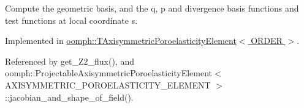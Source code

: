 Compute the geometric basis, and the q, p and divergence basis functions and test functions at local coordinate s. 



Implemented in \hyperlink{classoomph_1_1TAxisymmetricPoroelasticityElement_aac2d7977167e87f6e7c3e3f3fef4a60c}{oomph\+::\+T\+Axisymmetric\+Poroelasticity\+Element$<$ O\+R\+D\+E\+R $>$}.



Referenced by get\+\_\+\+Z2\+\_\+flux(), and oomph\+::\+Projectable\+Axisymmetric\+Poroelasticity\+Element$<$ A\+X\+I\+S\+Y\+M\+M\+E\+T\+R\+I\+C\+\_\+\+P\+O\+R\+O\+E\+L\+A\+S\+T\+I\+C\+I\+T\+Y\+\_\+\+E\+L\+E\+M\+E\+N\+T $>$\+::jacobian\+\_\+and\+\_\+shape\+\_\+of\+\_\+field().

\mbox{\label{classoomph_1_1AxisymmetricPoroelasticityEquations_a3e0f7b110f60d59bc047d9686de47111}} 
